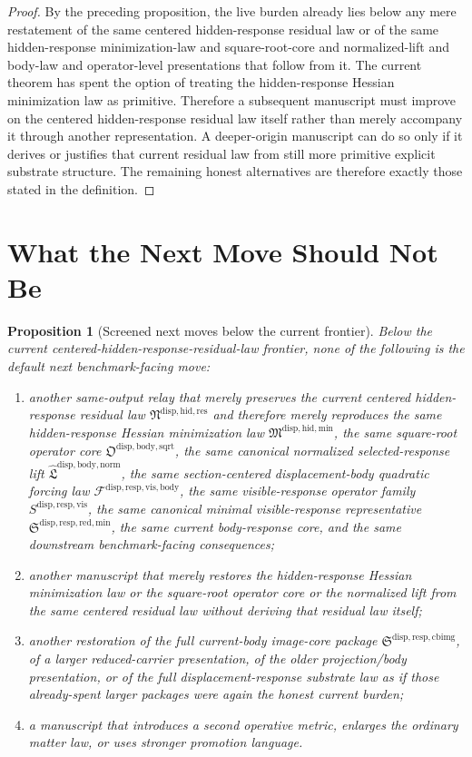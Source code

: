 \documentclass[11pt]{article}
\newcommand{\ResidualLawPackage}{\mathfrak N^{\mathrm{disp,hid,res}}}
\newcommand{\HiddenMinimizationPackage}{\mathfrak M^{\mathrm{disp,hid,min}}}
\newcommand{\SquareRootOperatorCore}{\mathfrak O^{\mathrm{disp,body,sqrt}}}
\newcommand{\NormalizedLiftPackage}{\widehat{\mathfrak L}^{\mathrm{disp,body,norm}}}
\newcommand{\VisibleBodyForcingLaw}{\mathscr F^{\mathrm{disp,resp,vis,body}}}
\newcommand{\VisibleResponseOperator}{S^{\mathrm{disp,resp,vis}}}
\newcommand{\MinimalReducedStructure}{\mathfrak S^{\mathrm{disp,resp,red,min}}}
\newcommand{\CurrentBodyImageCore}{\mathfrak S^{\mathrm{disp,resp,cbimg}}}
\newtheorem{proposition}{Proposition}
\begin{document}
\begin{proof}
By the preceding proposition, the live burden already lies below any mere restatement of the same centered hidden-response residual law or of the same hidden-response minimization-law and square-root-core and normalized-lift and body-law and operator-level presentations that follow from it. The current theorem has spent the option of treating the hidden-response Hessian minimization law as primitive. Therefore a subsequent manuscript must improve on the centered hidden-response residual law itself rather than merely accompany it through another representation. A deeper-origin manuscript can do so only if it derives or justifies that current residual law from still more primitive explicit substrate structure. The remaining honest alternatives are therefore exactly those stated in the definition.
\end{proof}

\section{What the Next Move Should Not Be}

\begin{proposition}[Screened next moves below the current frontier]
Below the current centered-hidden-response-residual-law frontier, none of the following is the default next benchmark-facing move:
\begin{enumerate}
    \item another same-output relay that merely preserves the current centered hidden-response residual law \(\ResidualLawPackage\) and therefore merely reproduces the same hidden-response Hessian minimization law \(\HiddenMinimizationPackage\), the same square-root operator core \(\SquareRootOperatorCore\), the same canonical normalized selected-response lift \(\NormalizedLiftPackage\), the same section-centered displacement-body quadratic forcing law \(\VisibleBodyForcingLaw\), the same visible-response operator family \(\VisibleResponseOperator\), the same canonical minimal visible-response representative \(\MinimalReducedStructure\), the same current body-response core, and the same downstream benchmark-facing consequences;
    \item another manuscript that merely restores the hidden-response Hessian minimization law or the square-root operator core or the normalized lift from the same centered residual law without deriving that residual law itself;
    \item another restoration of the full current-body image-core package \(\CurrentBodyImageCore\), of a larger reduced-carrier presentation, of the older projection/body presentation, or of the full displacement-response substrate law as if those already-spent larger packages were again the honest current burden;
    \item a manuscript that introduces a second operative metric, enlarges the ordinary matter law, or uses stronger promotion language.
\end{enumerate}
\end{proposition}
\end{document}

